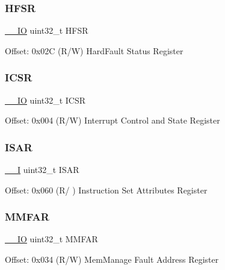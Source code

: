 \subsubsection{\texorpdfstring{HFSR}{HFSR}}
{\footnotesize\ttfamily \mbox{\hyperlink{core__sc300_8h_aec43007d9998a0a0e01faede4133d6be}{\+\_\+\+\_\+\+IO}} uint32\+\_\+t H\+F\+SR}

Offset\+: 0x02C (R/W) Hard\+Fault Status Register \mbox{\label{struct_s_c_b___type_a8fec9e122b923822e7f951cd48cf1d47}} 
\subsubsection{\texorpdfstring{ICSR}{ICSR}}
{\footnotesize\ttfamily \mbox{\hyperlink{core__sc300_8h_aec43007d9998a0a0e01faede4133d6be}{\+\_\+\+\_\+\+IO}} uint32\+\_\+t I\+C\+SR}

Offset\+: 0x004 (R/W) Interrupt Control and State Register \mbox{\label{struct_s_c_b___type_abdeaebf965a4ca1dfde816cab85f1156}} 
\subsubsection{\texorpdfstring{ISAR}{ISAR}}
{\footnotesize\ttfamily \mbox{\hyperlink{core__sc300_8h_af63697ed9952cc71e1225efe205f6cd3}{\+\_\+\+\_\+I}} uint32\+\_\+t I\+S\+AR}

Offset\+: 0x060 (R/ ) Instruction Set Attributes Register \mbox{\label{struct_s_c_b___type_a88820a178974aa7b7927155cee5c47ed}} 
\subsubsection{\texorpdfstring{MMFAR}{MMFAR}}
{\footnotesize\ttfamily \mbox{\hyperlink{core__sc300_8h_aec43007d9998a0a0e01faede4133d6be}{\+\_\+\+\_\+\+IO}} uint32\+\_\+t M\+M\+F\+AR}

Offset\+: 0x034 (R/W) Mem\+Manage Fault Address Register \mbox{\label{struct_s_c_b___type_a037095d7dc8c30536cab793e28329c45}} 
